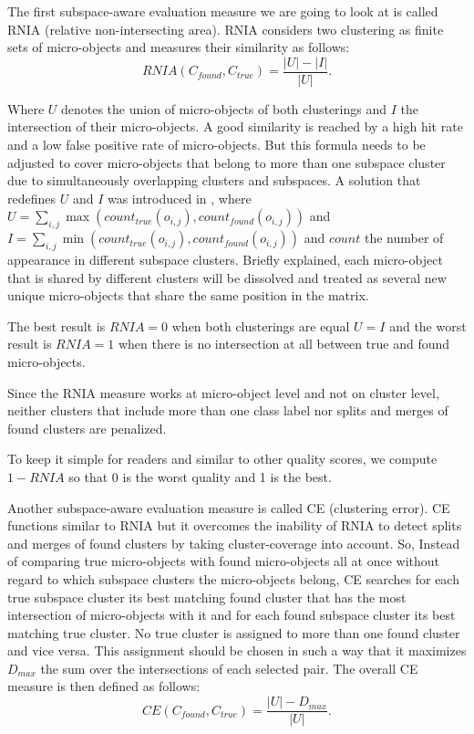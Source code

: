 The first subspace-aware evaluation measure we are going to look at is called RNIA (relative non-intersecting area). RNIA considers two clustering as finite sets of micro-objects and measures their similarity as follows:
\begin{equation} \label{eq:8}
RNIA(C_{found},C_{true}) = \frac{|U| - |I|}{|U|}.
\end{equation}

Where $U$ denotes the union of micro-objects of both clusterings and $I$ the intersection of their micro-objects. A good similarity is reached by a high hit rate and a low false positive rate of micro-objects. But this formula needs to be adjusted to cover micro-objects that belong to more than one subspace cluster due to simultaneously overlapping clusters and subspaces. A solution that redefines $U$ and $I$ was introduced in \citep{10.1109/TKDE.2006.106}, where $U = \sum_{i,j} \max(count_{true}(o_{i,j}), count_{found}(o_{i,j}))$ and $I = \sum_{i,j} \min(count_{true}(o_{i,j}), count_{found}(o_{i,j}))$ and $count$ the number of appearance in different subspace clusters. Briefly explained, each micro-object that is shared by different clusters will be dissolved and treated as several new unique micro-objects that share the same position in the matrix.

The best result is $RNIA = 0$ when both clusterings are equal $U = I$ and the worst result is $RNIA = 1$ when there is no intersection at all between true and found micro-objects.

Since the RNIA measure works at micro-object level and not on cluster level, neither clusters that include more than one class label nor splits and merges of found clusters are penalized.

To keep it simple for readers and similar to other quality scores, we compute $1 - RNIA$ so that 0 is the worst quality and 1 is the best.

Another subspace-aware evaluation measure is called CE (clustering error). CE functions similar to RNIA but it overcomes the inability of RNIA to detect splits and merges of found clusters by taking cluster-coverage into account. So, Instead of comparing true micro-objects with found micro-objects all at once without regard to which subspace clusters the micro-objects belong, CE searches for each true subspace cluster its best matching found cluster that has the most intersection of micro-objects with it and for each found subspace cluster its best matching true cluster. No true cluster is assigned to more than one found cluster and vice versa. This assignment should be chosen in such a way that it maximizes $D_{max}$ the sum over the intersections of each selected pair. The overall CE measure is then defined as follows:
\begin{equation} \label{eq:9}
CE(C_{found},C_{true}) = \frac{|U| - D_{max}}{|U|}.
\end{equation}

